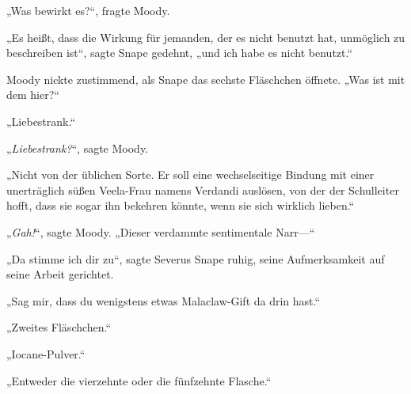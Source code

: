 „Was bewirkt es?“, fragte Moody.

„Es heißt, dass die Wirkung für jemanden, der es nicht benutzt hat, unmöglich zu beschreiben ist“, sagte Snape gedehnt, „und ich habe es nicht benutzt.“

Moody nickte zustimmend, als Snape das sechste Fläschchen öffnete. „Was ist mit dem hier?“

„Liebestrank.“

„\emph{Liebestrank?}“, sagte Moody.

„Nicht von der üblichen Sorte. Er soll eine wechselseitige Bindung mit einer unerträglich süßen Veela-Frau namens Verdandi auslösen, von der der Schulleiter hofft, dass sie sogar ihn bekehren könnte, wenn sie sich wirklich lieben.“

„\emph{Gah!}“, sagte Moody. „Dieser verdammte sentimentale Narr—“

„Da stimme ich dir zu“, sagte Severus Snape ruhig, seine Aufmerksamkeit auf seine Arbeit gerichtet.

„Sag mir, dass du wenigstens etwas Malaclaw-Gift da drin hast.“

„Zweites Fläschchen.“

„Iocane-Pulver.“

„Entweder die vierzehnte oder die fünfzehnte Flasche.“

